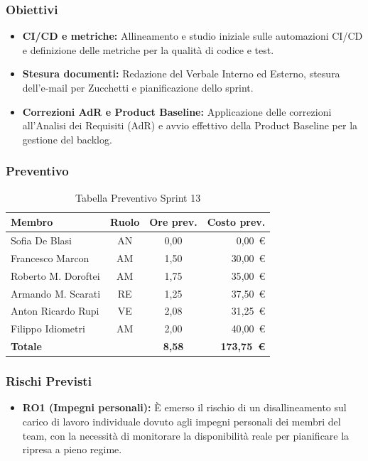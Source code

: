 \subsubsection{Obiettivi}
\begin{itemize}
    \item \textbf{CI/CD e metriche:} Allineamento e studio iniziale sulle automazioni CI/CD e definizione delle metriche per la qualità di codice e test.
    \item \textbf{Stesura documenti:} Redazione del Verbale Interno ed Esterno, stesura dell'e-mail per Zucchetti e pianificazione dello sprint.
    \item \textbf{Correzioni AdR e Product Baseline:} Applicazione delle correzioni all'Analisi dei Requisiti (AdR) e avvio effettivo della Product Baseline per la gestione del backlog.
\end{itemize}

\subsubsection{Preventivo}
\begin{table}[H]
    \centering
    \renewcommand{\arraystretch}{1.3}
    \begin{tabularx}{\textwidth}{|X|c|c|r|}
        \hline
        \textbf{Membro} & \textbf{Ruolo} & \textbf{Ore prev.} & \textbf{Costo prev.} \\
        \hline
        Sofia De Blasi       & AN & 0,00 & 0{,}00~\euro \\
        Francesco Marcon     & AM & 1,50 & 30{,}00~\euro \\
        Roberto M. Doroftei  & AM & 1,75 & 35{,}00~\euro \\
        Armando M. Scarati   & RE & 1,25 & 37{,}50~\euro \\
        Anton Ricardo Rupi   & VE & 2,08 & 31{,}25~\euro \\
        Filippo Idiometri    & AM & 2,00 & 40{,}00~\euro \\
        \hline
        \textbf{Totale}      &    & \textbf{8,58} & \textbf{173{,}75~\euro} \\
        \hline
    \end{tabularx}
    \caption{Tabella Preventivo Sprint 13} 
\end{table}

\subsubsection{Rischi Previsti}
\begin{itemize}
    \item \textbf{RO1 (Impegni personali):} È emerso il rischio di un disallineamento sul carico di lavoro individuale dovuto agli impegni personali dei membri del team, con la necessità di monitorare la disponibilità reale per pianificare la ripresa a pieno regime.
\end{itemize}


